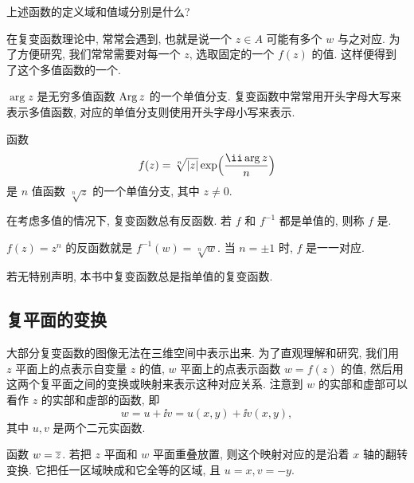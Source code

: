 \begin{exercise}
  上述函数的定义域和值域分别是什么?
\end{exercise}

在复变函数理论中, 常常会遇到, 也就是说一个 $z\in A$ 可能有多个 $w$ 与之对应.
为了方便研究, 我们常常需要对每一个 $z$, 选取固定的一个 $f(z)$ 的值.
这样便得到了这个多值函数的一个.
\begin{exampleenum}
  \item $\arg z$ 是无穷多值函数 $\operatorname{Arg} z$ 的一个单值分支.
  复变函数中常常用开头字母大写来表示多值函数, 对应的单值分支则使用开头字母小写来表示.
  \item 函数
  \[
    f(z)=\sqrt[n]{|z|}\exp\Bigl(\frac{\ii\arg z}n\Bigr)
  \]
  是 $n$ 值函数 $\sqrt[n]z$ 的一个单值分支, 其中 $z\neq 0$.
\end{exampleenum}

在考虑多值的情况下, 复变函数总有反函数.
若 $f$ 和 $f^{-1}$ 都是单值的, 则称 $f$ 是.

\begin{example}
  $f(z)=z^n$ 的反函数就是 $f^{-1}(w)=\sqrt[n]{w}$.
  {当 $n=\pm1$ 时, $f$ 是一一对应.}
\end{example}

若无特别声明, 本书中\alert{复变函数总是指单值的复变函数}.


\subsection{复平面的变换}

大部分复变函数的图像无法在三维空间中表示出来.
为了直观理解和研究, 我们用 $z$ 平面上的点表示自变量 $z$ 的值, $w$ 平面上的点表示函数 $w=f(z)$ 的值, 然后用这两个复平面之间的变换或映射来表示这种对应关系.
注意到 $w$ 的实部和虚部可以看作 $z$ 的实部和虚部的函数, 即
\[
  w=u+\ii v=u(x,y)+\ii v(x,y),
\]
其中 $u,v$ 是两个二元实函数.

\begin{example}
  函数 $w=\overline z$.
  若把 $z$ 平面和 $w$ 平面重叠放置, 则这个映射对应的是沿着 $x$ 轴的翻转变换.
  它把任一区域映成和它全等的区域, 且 $u=x,v=-y$.
\end{example}

